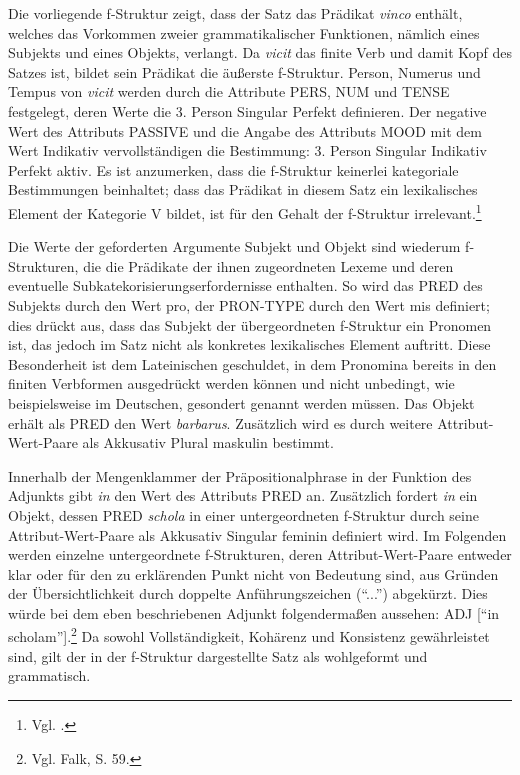 \documentclass[12pt,a4paper]{article}
\begin{document}
Die vorliegende f-Struktur zeigt, dass der Satz das Prädikat \textit{vinco} enthält, welches das Vorkommen zweier grammatikalischer Funktionen, nämlich eines Subjekts und eines Objekts, verlangt. Da \textit{vicit} das finite Verb und damit Kopf des Satzes ist, bildet sein Prädikat die äußerste f-Struktur. Person, Numerus und Tempus von \textit{vicit} werden durch die Attribute  PERS, NUM und TENSE festgelegt, deren Werte die 3. Person Singular Perfekt definieren. Der negative Wert des Attributs PASSIVE und die Angabe des Attributs MOOD mit dem Wert Indikativ vervollständigen die Bestimmung: 3. Person Singular Indikativ Perfekt aktiv. Es ist anzumerken, dass die f-Struktur keinerlei kategoriale Bestimmungen beinhaltet; dass das Prädikat in diesem Satz ein lexikalisches Element der Kategorie V bildet, ist für den Gehalt der f-Struktur irrelevant.\footnote{Vgl. \cite[7]{Skript}.}

Die Werte der geforderten Argumente Subjekt und Objekt sind wiederum f-Strukturen, die die Prädikate der ihnen zugeordneten Lexeme und deren eventuelle Subkatekorisierungserfordernisse enthalten. So wird das PRED des Subjekts durch den Wert pro, der PRON-TYPE durch den Wert mis definiert; dies drückt aus, dass das Subjekt der übergeordneten f-Struktur ein Pronomen ist, das jedoch im Satz nicht als konkretes lexikalisches Element auftritt. Diese Besonderheit ist dem Lateinischen geschuldet, in dem Pronomina bereits in den finiten Verbformen ausgedrückt werden können und nicht unbedingt, wie beispielsweise im Deutschen, gesondert genannt werden müssen. Das Objekt erhält als PRED den Wert \textit{barbarus}. Zusätzlich wird es durch weitere Attribut-Wert-Paare als Akkusativ Plural maskulin bestimmt. 

Innerhalb der Mengenklammer der Präpositionalphrase in der Funktion des Adjunkts gibt \textit{in} den Wert des Attributs PRED an. Zusätzlich fordert \textit{in} ein Objekt, dessen PRED \textit{schola} in einer untergeordneten f-Struktur durch seine Attribut-Wert-Paare als Akkusativ Singular feminin definiert wird. Im Folgenden werden einzelne untergeordnete f-Strukturen, deren Attribut-Wert-Paare entweder klar oder für den zu erklärenden Punkt nicht von Bedeutung sind, aus Gründen der Übersichtlichkeit durch doppelte Anführungszeichen (``...'') abgekürzt. Dies würde bei dem eben beschriebenen Adjunkt folgendermaßen aussehen: ADJ [“in scholam”].\footnote{Vgl. Falk, S. 59.}
Da sowohl Vollständigkeit, Kohärenz und Konsistenz gewährleistet sind, gilt der in der f-Struktur dargestellte Satz als wohlgeformt und grammatisch.
\end{document}
